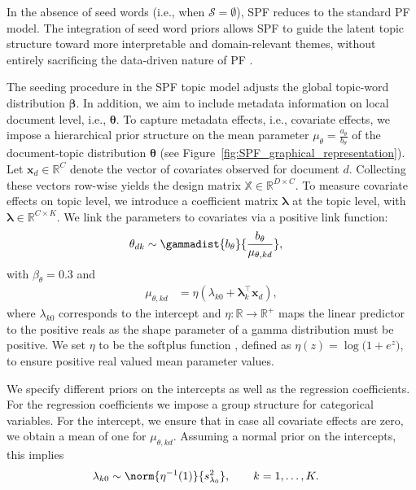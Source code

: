 In the absence of seed words (i.e., when $\mathcal{S} = \emptyset$), SPF reduces to the standard PF model. The integration of seed word priors allows SPF to guide the latent topic structure toward more interpretable and domain-relevant themes, without entirely sacrificing the data-driven nature of PF \citep[see][]{PROSTMAIER2025114116}.


The seeding procedure in the SPF topic model adjusts the global topic-word distribution $\bm{\beta}$. In addition, we aim to include metadata information on local document level, i.e., $\bm{\theta}$. To capture metadata effects, i.e., covariate effects, we impose a hierarchical prior structure on the mean parameter $\mu_\theta = \frac{a_\theta}{b_\theta}$ of the document-topic distribution $\bm{\theta}$ (see Figure~\ref{fig:SPF_graphical_representation}). Let $\bm{x}_d\in\mathbb{R}^{C}$ denote the vector of covariates observed for document $d$. Collecting these vectors row-wise yields the design matrix $\mathbb{X}\in\mathbb{R}^{D\times C}$. To measure covariate effects on topic level, we introduce a coefficient matrix $\bm{\lambda}$ at the topic level, with $\bm{\lambda}\in\mathbb{R}^{C\times K}$. We link the parameters to covariates via a positive link function:
%
\begin{align}
    \theta_{dk} &\sim \gammadist{b_{\theta}}{\frac{b_{\theta}}{\mu_{\theta, kd}}},
\end{align}
%
with $\beta_{\theta} = 0.3$ and
%
\begin{align}
    \mu_{\theta, kd} &= \eta(\lambda_{k0} + \bm{\lambda}_k^\top \bm{x}_d),
\end{align}
%
where $\lambda_{k0}$ corresponds to the intercept and $\eta:\mathbb{R} \xrightarrow{} \mathbb{R^+}$ maps the linear predictor to the positive reals as the shape parameter of a gamma distribution must be positive. We set $\eta$ to be the softplus function \citep{dugas2001softplus}, defined as $\eta(z)=\log\!\bigl(1+e^{z}\bigr)$, to ensure positive real valued mean parameter values. 

We specify different priors on the intercepts as well as the regression coefficients. For the regression coefficients we impose a group structure for categorical variables. For the intercept, we ensure that in case all covariate effects are zero, we obtain a mean of one for $\mu_{\theta, kd}$. 
Assuming a normal prior on the intercepts, this implies
%
\begin{align}
    \lambda_{k0} &\sim \norm{\eta^{-1}(1)}{s^2_{\lambda_0}}, \qquad k=1,\ldots,K.
\end{align}
%

